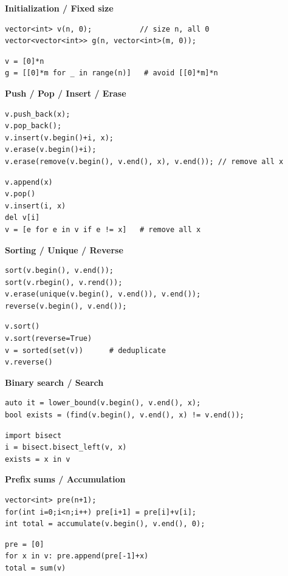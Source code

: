 \textbf{Initialization / Fixed size}
\begin{verbatim}
vector<int> v(n, 0);           // size n, all 0
vector<vector<int>> g(n, vector<int>(m, 0));
\end{verbatim}

\begin{verbatim}
v = [0]*n
g = [[0]*m for _ in range(n)]   # avoid [[0]*m]*n
\end{verbatim}

\textbf{Push / Pop / Insert / Erase}
\begin{verbatim}
v.push_back(x);         
v.pop_back();
v.insert(v.begin()+i, x);
v.erase(v.begin()+i);
v.erase(remove(v.begin(), v.end(), x), v.end()); // remove all x
\end{verbatim}

\begin{verbatim}
v.append(x)
v.pop()
v.insert(i, x)
del v[i]
v = [e for e in v if e != x]   # remove all x
\end{verbatim}

\textbf{Sorting / Unique / Reverse}
\begin{verbatim}
sort(v.begin(), v.end());
sort(v.rbegin(), v.rend());
v.erase(unique(v.begin(), v.end()), v.end());
reverse(v.begin(), v.end());
\end{verbatim}

\begin{verbatim}
v.sort()
v.sort(reverse=True)
v = sorted(set(v))      # deduplicate
v.reverse()
\end{verbatim}

\textbf{Binary search / Search}
\begin{verbatim}
auto it = lower_bound(v.begin(), v.end(), x);
bool exists = (find(v.begin(), v.end(), x) != v.end());
\end{verbatim}

\begin{verbatim}
import bisect
i = bisect.bisect_left(v, x)
exists = x in v
\end{verbatim}

\textbf{Prefix sums / Accumulation}
\begin{verbatim}
vector<int> pre(n+1);
for(int i=0;i<n;i++) pre[i+1] = pre[i]+v[i];
int total = accumulate(v.begin(), v.end(), 0);
\end{verbatim}

\begin{verbatim}
pre = [0]
for x in v: pre.append(pre[-1]+x)
total = sum(v)
\end{verbatim}

